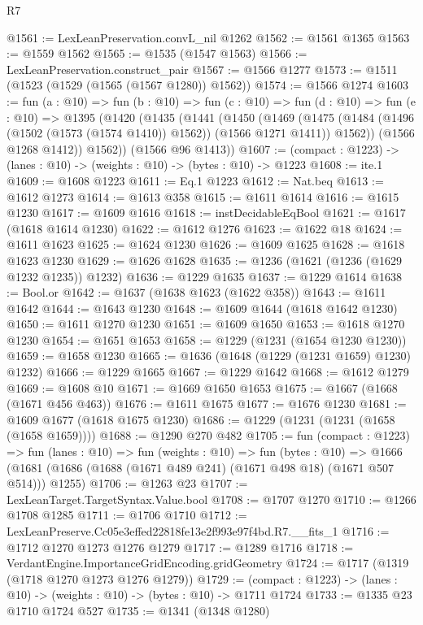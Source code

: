 \begin{lexlean}{R7}
\begin{coremodule}
@1561 := LexLeanPreservation.convL_nil @1262
@1562 := @1561 @1365
@1563 := @1559 @1562
@1565 := @1535 (@1547 @1563)
@1566 := LexLeanPreservation.construct_pair
@1567 := @1566 @1277
@1573 := @1511 (@1523 (@1529 (@1565 (@1567 @1280)) @1562))
@1574 := @1566 @1274
@1603 := fun (a : @10) =>
  fun (b : @10) =>
  fun (c : @10) =>
  fun (d : @10) =>
  fun (e : @10) =>
  @1395
    (@1420
      (@1435
        (@1441
          (@1450
            (@1469
              (@1475 (@1484 (@1496 (@1502 (@1573 (@1574 @1410)) @1562)) (@1566 @1271 @1411)) @1562))
            (@1566 @1268 @1412))
          @1562))
      (@1566 @96 @1413))
@1607 := (compact : @1223) -> (lanes : @10) -> (weights : @10) -> (bytes : @10) -> @1223
@1608 := ite.{1}
@1609 := @1608 @1223
@1611 := Eq.{1} @1223
@1612 := Nat.beq
@1613 := @1612 @1273
@1614 := @1613 @358
@1615 := @1611 @1614
@1616 := @1615 @1230
@1617 := @1609 @1616
@1618 := instDecidableEqBool
@1621 := @1617 (@1618 @1614 @1230)
@1622 := @1612 @1276
@1623 := @1622 @18
@1624 := @1611 @1623
@1625 := @1624 @1230
@1626 := @1609 @1625
@1628 := @1618 @1623 @1230
@1629 := @1626 @1628
@1635 := @1236 (@1621 (@1236 (@1629 @1232 @1235)) @1232)
@1636 := @1229 @1635
@1637 := @1229 @1614
@1638 := Bool.or
@1642 := @1637 (@1638 @1623 (@1622 @358))
@1643 := @1611 @1642
@1644 := @1643 @1230
@1648 := @1609 @1644 (@1618 @1642 @1230)
@1650 := @1611 @1270 @1230
@1651 := @1609 @1650
@1653 := @1618 @1270 @1230
@1654 := @1651 @1653
@1658 := @1229 (@1231 (@1654 @1230 @1230))
@1659 := @1658 @1230
@1665 := @1636 (@1648 (@1229 (@1231 @1659) @1230) @1232)
@1666 := @1229 @1665
@1667 := @1229 @1642
@1668 := @1612 @1279
@1669 := @1608 @10
@1671 := @1669 @1650 @1653
@1675 := @1667 (@1668 (@1671 @456 @463))
@1676 := @1611 @1675
@1677 := @1676 @1230
@1681 := @1609 @1677 (@1618 @1675 @1230)
@1686 := @1229 (@1231 (@1231 (@1658 (@1658 @1659))))
@1688 := @1290 @270 @482
@1705 := fun (compact : @1223) =>
  fun (lanes : @10) =>
  fun (weights : @10) =>
  fun (bytes : @10) =>
  @1666 (@1681 (@1686 (@1688 (@1671 @489 @241) (@1671 @498 @18) (@1671 @507 @514))) @1255)
@1706 := @1263 @23
@1707 := LexLeanTarget.TargetSyntax.Value.bool
@1708 := @1707 @1270
@1710 := @1266 @1708 @1285
@1711 := @1706 @1710
@1712 := LexLeanPreserve.Cc05e3effed22818fe13e2f993e97f4bd.R7.__fits_1
@1716 := @1712 @1270 @1273 @1276 @1279
@1717 := @1289 @1716
@1718 := VerdantEngine.ImportanceGridEncoding.gridGeometry
@1724 := @1717 (@1319 (@1718 @1270 @1273 @1276 @1279))
@1729 := (compact : @1223) -> (lanes : @10) -> (weights : @10) -> (bytes : @10) -> @1711 @1724
@1733 := @1335 @23 @1710 @1724 @527
@1735 := @1341 (@1348 @1280)

\end{coremodule}
\end{lexlean}

